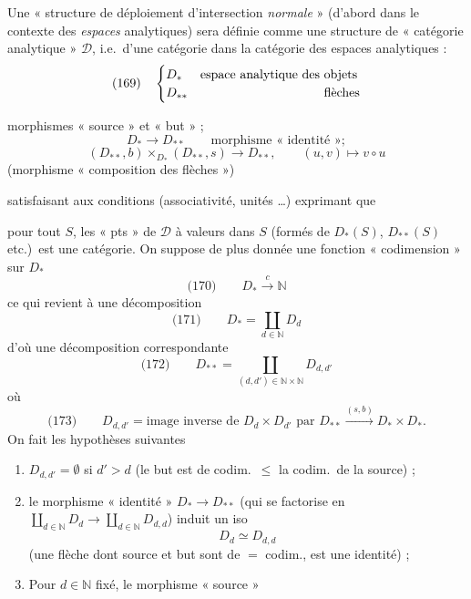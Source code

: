 \documentclass[11pt,a4paper]{article}
\begin{document}
Une « structure de déploiement d'intersection \emph{normale} » (d'abord dans le
contexte des \emph{espaces} analytiques) sera définie  comme une
 structure de « catégorie analytique » $\mathcal{D}$, i.e.\ d'une
catégorie dans la catégorie des espaces analytiques :
\[
  \text{(169)}\quad
  \begin{cases}
    D_{*} & \text{espace analytique des objets} \\
    D_{**} & \text{\phantom{espace analytique des} flèches}
  \end{cases}
\]


morphismes « source » et « but » ;
\[
  D_{*} \longrightarrow D_{**} \qquad \text{morphisme « identité »} ;
\]
\[
  (D_{**}, b) \times_{D_{*}} (D_{**}, s) \longrightarrow D_{**}, \qquad (u, v) \longmapsto v \circ u
\]
(morphisme « composition des flèches »)

satisfaisant aux conditions \struck{\ill{}}  (associativité, unités …)
exprimant que

pour tout $S$, les « pts » de $\mathcal{D}$ à valeurs dans $S$ (formés de
$D_{*}(S)$, $D_{**}(S)$ etc.)\ est une catégorie. On suppose de plus donnée une
fonction « codimension » sur $D_{*}$
\[
  \text{(170)}\qquad D_{*} \overset{c}{\longrightarrow} \mathbb{N}
\]
ce qui revient à une décomposition
\[
  \text{(171)}\qquad D_{*} = \coprod_{d\in\mathbb{N}} D_d
\]
d'où une décomposition correspondante
\[
  \text{(172)}\qquad D_{**} = \coprod_{(d,d')\in\mathbb{N}\times\mathbb{N}} D_{d,d'}
\]
où
\[
  \text{(173)}\qquad D_{d,d'} = \text{image inverse de } D_d \times D_{d'}
  \text{ par } D_{**} \xrightarrow{(s,b)} D_{*} \times D_{*} .
\]
On fait les hypothèses suivantes
\begin{enumerate}
  \item[a)] $D_{d,d'} = \emptyset$ si $d' > d$ (le but est de codim.\ $\leq$ la codim.\ de la source) ;
  \item[b)] le morphisme « identité » $D_{*} \to D_{**}$  (qui se factorise en
  $\coprod_{d\in\mathbb{N}} D_d \to \coprod_{d\in\mathbb{N}} D_{d,d}$) induit un iso
  \[
    D_d \simeq D_{d,d}
  \]
  (une flèche dont source et but sont de $=$ codim., est une identité) ;
  \item[c)] Pour $d \in \mathbb{N}$ fixé, le morphisme « source » 
\end{enumerate}
\end{document}
